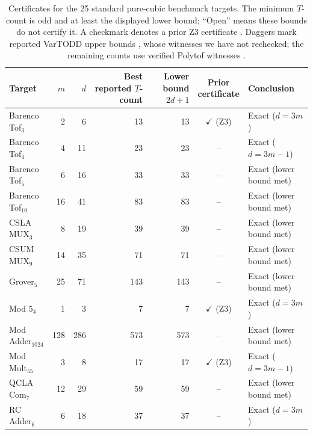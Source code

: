 \begin{table}[t]
\centering
\footnotesize
\setlength{\tabcolsep}{3.5pt}
\renewcommand{\arraystretch}{0.95}
\caption{Certificates for the 25 standard pure-cubic benchmark targets.  The minimum $T$-count is odd and at least the displayed lower bound; ``Open'' means these bounds do not certify it.  A checkmark denotes a prior Z3 certificate \cite{RuizEtAl2025}.  Daggers mark reported VarTODD upper bounds \cite{FisherEtAl2026}, whose witnesses we have not rechecked; the remaining counts use verified Polytof witnesses \cite{KhoruzhiiTensor2026,PolytofArtifact2026}.}
\label{tab:benchmark-certificates}
\begin{tabular*}{\textwidth}{@{\extracolsep{\fill}}lrrrrcl@{}}
\toprule
Target
  & $m$
  & $d$
  & \shortstack{Best reported\\$T$-count}
  & \shortstack{Lower bound\\$2d+1$}
  & \shortstack{Prior\\certificate}
  & Conclusion \\
\midrule
Barenco Tof$_3$      & 2   & 6   & 13  & 13  & $\checkmark$ (Z3) & Exact ($d=3m$) \\
Barenco Tof$_4$      & 4   & 11  & 23  & 23  & --                  & Exact ($d=3m-1$) \\
Barenco Tof$_5$      & 6   & 16  & 33  & 33  & --                  & Exact (lower bound met) \\
Barenco Tof$_{10}$   & 16  & 41  & 83  & 83  & --                  & Exact (lower bound met) \\
CSLA MUX$_3$         & 8   & 19  & 39  & 39  & --                  & Exact (lower bound met) \\
CSUM MUX$_9$         & 14  & 35  & 71  & 71  & --                  & Exact (lower bound met) \\
Grover$_5$           & 25  & 71  & 143 & 143 & --                  & Exact (lower bound met) \\
Mod $5_4$            & 1   & 3   & 7   & 7   & $\checkmark$ (Z3) & Exact ($d=3m$) \\
Mod Adder$_{1024}$   & 128 & 286 & 573 & 573 & --                  & Exact (lower bound met) \\
Mod Mult$_{55}$      & 3   & 8   & 17  & 17  & $\checkmark$ (Z3) & Exact ($d=3m-1$) \\
QCLA Com$_7$         & 12  & 29  & 59  & 59  & --                  & Exact (lower bound met) \\
RC Adder$_6$         & 6   & 18  & 37  & 37  & --                  & Exact ($d=3m$) \\

\end{tabular*}
\end{table}
